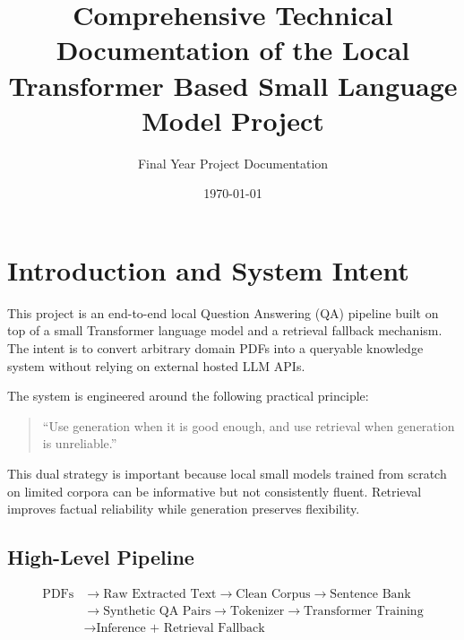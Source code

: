 \documentclass[a4paper,11pt]{article}
\title{Comprehensive Technical Documentation of the Local Transformer Based Small Language Model Project}
\author{Final Year Project Documentation}
\date{\today}
\begin{document}
\sloppy
\maketitle

\tableofcontents
\newpage

\section{Introduction and System Intent}
This project is an end-to-end local Question Answering (QA) pipeline built on top of a small Transformer language model and a retrieval fallback mechanism.
The intent is to convert arbitrary domain PDFs into a queryable knowledge system without relying on external hosted LLM APIs.

The system is engineered around the following practical principle:
\begin{quote}
``Use generation when it is good enough, and use retrieval when generation is unreliable.''
\end{quote}

This dual strategy is important because local small models trained from scratch on limited corpora can be informative but not consistently fluent.
Retrieval improves factual reliability while generation preserves flexibility.

\subsection{High-Level Pipeline}
\[
\begin{aligned}
\text{PDFs} &\rightarrow \text{Raw Extracted Text} \rightarrow \text{Clean Corpus} \rightarrow \text{Sentence Bank} \\
&\rightarrow \text{Synthetic QA Pairs} \rightarrow \text{Tokenizer} \rightarrow \text{Transformer Training} \\
&\rightarrow \text{Inference + Retrieval Fallback}
\end{aligned}
\]
\end{document}
